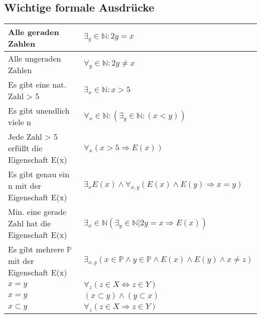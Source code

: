 \subsection{Wichtige formale Ausdrücke}
\begin{longtable}{p{}|p{}}
	Alle geraden Zahlen & \( \exists_y \in \mathbb{N}: 2y = x \)\\
	\hline
	Alle ungeraden Zahlen & \( \forall_y \in \mathbb{N}: 2y \neq x \)\\
	\hline
	Es gibt eine nat. Zahl > 5 & \(\exists_x \in \mathbb{N}: x > 5 \)\\
	\hline
	Es gibt unendlich viele n & \(\forall_x \in \mathbb{N}: (\exists_y \in \mathbb{N}: (x < y)) \)\\
	\hline
	Jede Zahl > 5 erfüllt die Eigenschaft E(x) & \(\forall_x (x > 5 \Rightarrow E(x)) \)\\
	\hline
	Es gibt genau ein n mit der Eigenschaft E(x) & \(\exists_x E(x) \wedge \forall_{x,y} (E(x) \wedge E(y) \Rightarrow x= y)\) \\
	\hline
	Min. eine gerade Zahl hat die Eigenschaft E(x) & \(\exists_x \in \mathbb{N} (\exists_y \in \mathbb{N} | 2y = x \Rightarrow E(x))\) \\
		\hline
		Es gibt mehrere $\mathbb{P}$ mit der Eigenschaft E(x) & \(\exists_{x,y} (x \in \mathbb{P} \wedge y \in \mathbb{P} \wedge E(x) \wedge E(y) \wedge x \neq z)\) \\
		\hline
	\(x = y\) & \(\forall_z(z \in X \Leftrightarrow z \in Y) \) \\
	\(x = y\) & \((x \subset y) \wedge (y \subset x)\) \\
	\hline
	\(x \subset y\) & \(\forall_z(z \in X \Rightarrow z \in Y) \) \\

\end{longtable}
